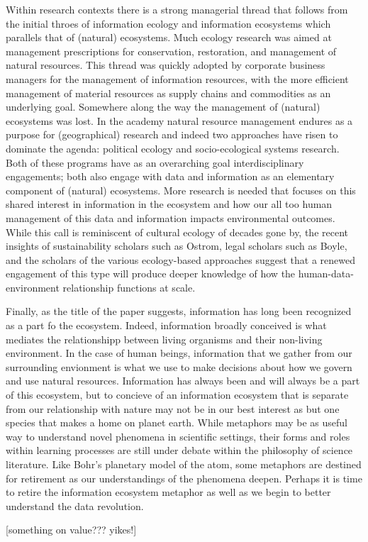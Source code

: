 Within research contexts there is a strong managerial thread that follows from the initial throes of information ecology and information ecosystems which parallels that of (natural) ecosystems. Much ecology research was aimed at management prescriptions for conservation, restoration, and management of natural resources. This thread was quickly adopted by corporate business managers for the management of information resources, with the more efficient management of material resources as supply chains and commodities as an underlying goal. Somewhere along the way the management of (natural) ecosystems was lost. In the academy natural resource management endures as a purpose for (geographical) research and indeed two approaches have risen to dominate the agenda: political ecology and socio-ecological systems research. Both of these programs have as an overarching goal interdisciplinary engagements; both also engage with data and information as an elementary component of (natural) ecosystems. More research is needed that focuses on this shared interest in information in the ecosystem and how our all too human management of this data and information impacts environmental outcomes. While this call is reminiscent of cultural ecology of decades gone by, the recent insights of sustainability scholars such as Ostrom, legal scholars such as Boyle, and the scholars of the various ecology-based approaches suggest that a renewed engagement of this type will produce deeper knowledge of how the human-data-environment relationship functions at scale.

Finally, as the title of the paper suggests, information has long been recognized as a part fo the ecosystem. Indeed, information broadly conceived is what mediates the relationshipp between living organisms and their non-living environment. In the case of human beings, information that we gather from our surrounding envionment is what we use to make decisions about how we govern and use natural resources. Information has always been and will always be a part of this ecosystem, but to concieve of an information ecosystem that is separate from our relationship with nature may not be in our best interest as but one species that makes a home on planet earth. While metaphors may be as useful way to understand novel phenomena in scientific settings, their forms and roles within learning processes are still under debate within the philosophy of science literature. Like Bohr's planetary model of the atom, some metaphors are destined for retirement as our understandings of the phenomena deepen. Perhaps it is time to retire the information ecosystem metaphor as well as we begin to better understand the data revolution.

[something on value??? yikes!]
